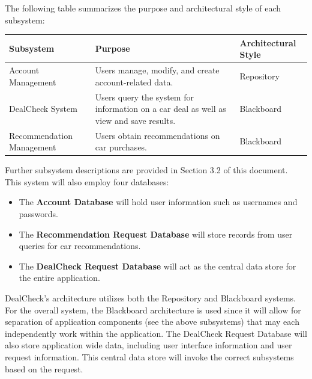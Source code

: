 \documentclass[]{article}
\begin{document}
\noindent The following table summarizes the purpose and architectural style of each subsystem:
\FloatBarrier
\begin{table}[H]
  \centering
  \begin{tabular}{|p{5cm}|p{7cm}|p{3cm}|}
    \hline
    \textbf{Subsystem}        & \textbf{Purpose}                                                                       & \textbf{Architectural Style} \\
    \hline
    Account Management        & Users manage, modify, and create account-related data.                                 & Repository                   \\
    \hline
    DealCheck System    & Users query the system for information on a car deal as well as view and save results. & Blackboard                   \\
    \hline
    Recommendation Management & Users obtain recommendations on car purchases.                                         & Blackboard                   \\
    \hline
  \end{tabular}
  \label{tab:dealcheck_subsystems}
\end{table}
\FloatBarrier
\noindent
Further subsystem descriptions are provided in Section 3.2 of this document. \\
\newline
This system will also employ four databases:
\begin{itemize}
  \item The \textbf{Account Database} will hold user information such as usernames and passwords.
  \item The \textbf{Recommendation Request Database} will store records from user queries for car recommendations.
  \item The \textbf{DealCheck Request Database} will act as the central data store for the entire application.
\end{itemize}

DealCheck’s architecture utilizes both the Repository and Blackboard systems. For the overall system, the Blackboard architecture is used since it will allow for separation of application components (see the above subsystems) that may each independently work within the application. The DealCheck Request Database will also store application wide data, including user interface information and user request information. This central data store will invoke the correct subsystems based on the request. \\
\end{document}
